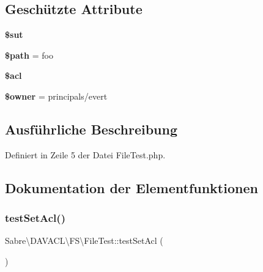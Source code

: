 \subsection*{Geschützte Attribute}
\begin{DoxyCompactItemize}
\item 
\mbox{\label{class_sabre_1_1_d_a_v_a_c_l_1_1_f_s_1_1_file_test_a7cc2dbb212f9689dc17d4d2a8b891b6e}} 
{\bfseries \$sut}
\item 
\mbox{\label{class_sabre_1_1_d_a_v_a_c_l_1_1_f_s_1_1_file_test_a28f0734a3505e9ac24b90ced44711e36}} 
{\bfseries \$path} = \textquotesingle{}foo\textquotesingle{}
\item 
{\bfseries \$acl}
\item 
\mbox{\label{class_sabre_1_1_d_a_v_a_c_l_1_1_f_s_1_1_file_test_ad0f5deeb4662a052e464e2d4092930e9}} 
{\bfseries \$owner} = \textquotesingle{}principals/evert\textquotesingle{}
\end{DoxyCompactItemize}


\subsection{Ausführliche Beschreibung}


Definiert in Zeile 5 der Datei File\+Test.\+php.



\subsection{Dokumentation der Elementfunktionen}
\mbox{\label{class_sabre_1_1_d_a_v_a_c_l_1_1_f_s_1_1_file_test_a6e9a9ec83ffc659102894163f489da29}} 
\subsubsection{\texorpdfstring{test\+Set\+Acl()}{testSetAcl()}}
{\footnotesize\ttfamily Sabre\textbackslash{}\+D\+A\+V\+A\+C\+L\textbackslash{}\+F\+S\textbackslash{}\+File\+Test\+::test\+Set\+Acl (\begin{DoxyParamCaption}{ }\end{DoxyParamCaption})}



